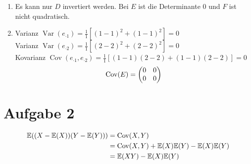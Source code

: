 \documentclass{article}
\newcommand{\E}{\mathbb{E}}
\DeclareMathOperator{\Var}{Var}
\DeclareMathOperator{\Cov}{Cov}
\begin{document}
\begin{enumerate}[label=(\alph*)]
		\item Es kann nur $D$ invertiert werden. Bei $E$ ist die Determinante 0 und $F$ ist nicht quadratisch.
		\item Varianz $\Var(e_{\cdot1}) = \frac{1}{1}[(1-1)^2 + (1-1)^2] = 0$ \\
		Varianz $\Var(e_{\cdot2}) = \frac{1}{1}[(2-2)^2 + (2-2)^2] = 0$ \\
		Kovarianz $\Cov(e_{\cdot1},e_{\cdot 2}) = \frac{1}{1}[(1-1)(2-2) + (1-1)(2-2)] = 0$
		\begin{align}
			\Cov(E) = \begin{pmatrix}
				0 & 0 \\ 0 & 0
			\end{pmatrix} \notag
		\end{align}
	\end{enumerate}
	
	\section*{Aufgabe 2}
	\begin{align}
		\E((X-\E(X))(Y-\E(Y))) &= \Cov(X,Y) \notag \\
		&= \Cov(X,Y) + \E(X)\E(Y) - \E(X)\E(Y) \notag \\
		&= \E(XY) - \E(X)\E(Y) \notag
	\end{align}
	
\end{document}
